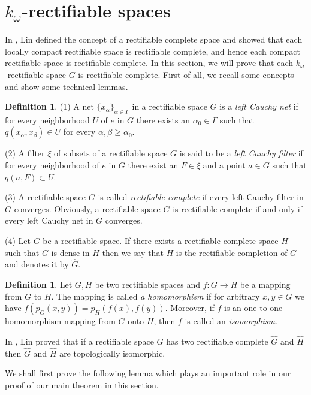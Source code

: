 \documentclass[psamsfonts,fceqn,leqno]{amsart}
\theoremstyle{definition}
\newtheorem{definition}[theorem]{Definition}
\begin{document}
\section{$k_{\omega}$-rectifiable spaces}
In \cite{LF4}, Lin defined the concept of a rectifiable complete space and showed that each locally compact rectifiable space is  rectifiable complete, and hence each compact rectifiable space is rectifiable complete. In this section, we will prove that each $k_{\omega}$-rectifiable space $G$ is rectifiable complete. First of all, we recall some concepts and show some technical lemmas.

\begin{definition}
(1) A net $\{x_{\alpha}\}_{\alpha\in\Gamma}$ in a rectifiable space $G$ is a {\it left Cauchy net} if for every neighborhood $U$ of $e$ in $G$ there exists an $\alpha_{0}\in\Gamma$ such that $q(x_{\alpha}, x_{\beta})\in U$ for every $\alpha, \beta\geq\alpha_{0}.$

(2) A filter $\xi$ of subsets of a rectifiable space $G$ is said to be a {\it left Cauchy filter} if for every neighborhood of $e$ in $G$ there exist an $F\in\xi$ and a point $a\in G$ such that $q(a, F)\subset U$.

(3) A rectifiable space $G$ is called {\it rectifiable complete} if every left Cauchy filter in $G$ converges. Obviously, a rectifiable space $G$ is rectifiable complete if and only if every left Cauchy net in $G$ converges.

(4) Let $G$ be a rectifiable space. If there exists a rectifiable complete space $H$ such that $G$ is dense in $H$ then we say that $H$ is the rectifiable completion of $G$ and denotes it by $\widehat{G}$.
\end{definition}

\begin{definition}Let $G, H$ be two rectifiable spaces and $f: G\rightarrow H$ be a mapping from $G$ to $H$. The mapping is called {\it a homomorphism} if for arbitrary $x, y\in G$ we have $f(p_{G}(x, y))=p_{H}(f(x), f(y)).$ Moreover, if $f$ is an one-to-one homomorphism mapping from $G$ onto $H$, then $f$ is called an {\it isomorphism}.
\end{definition}

In \cite{LF4}, Lin proved that if a rectifiable space $G$ has two rectifiable complete $\widehat{G}$ and $\widehat{H}$ then $\widehat{G}$ and $\widehat{H}$ are topologically isomorphic.

We shall first prove the following lemma which plays an important role in our proof of our main theorem in this section.
\end{document}
